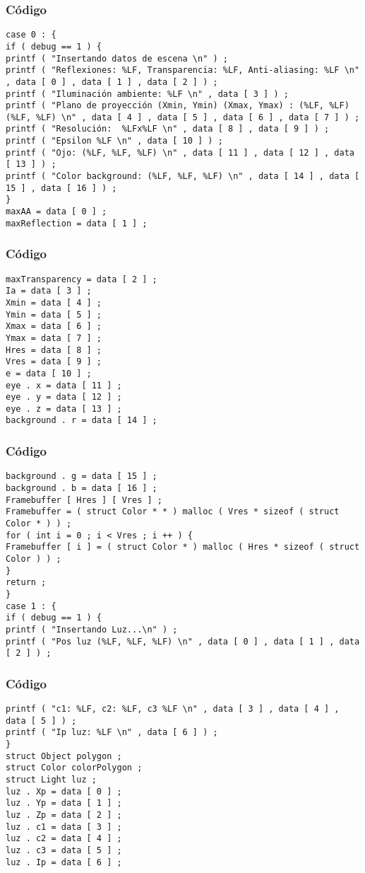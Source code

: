\documentclass{beamer}
\begin{document}
\begin{frame}[fragile]
\frametitle{C\'odigo}
\begin{verbatim}
case 0 : { 
if ( debug == 1 ) { 
printf ( "Insertando datos de escena \n" ) ; 
printf ( "Reflexiones: %LF, Transparencia: %LF, Anti-aliasing: %LF \n" , data [ 0 ] , data [ 1 ] , data [ 2 ] ) ; 
printf ( "Iluminación ambiente: %LF \n" , data [ 3 ] ) ; 
printf ( "Plano de proyección (Xmin, Ymin) (Xmax, Ymax) : (%LF, %LF) (%LF, %LF) \n" , data [ 4 ] , data [ 5 ] , data [ 6 ] , data [ 7 ] ) ; 
printf ( "Resolución:  %LFx%LF \n" , data [ 8 ] , data [ 9 ] ) ; 
printf ( "Epsilon %LF \n" , data [ 10 ] ) ; 
printf ( "Ojo: (%LF, %LF, %LF) \n" , data [ 11 ] , data [ 12 ] , data [ 13 ] ) ; 
printf ( "Color background: (%LF, %LF, %LF) \n" , data [ 14 ] , data [ 15 ] , data [ 16 ] ) ; 
} 
maxAA = data [ 0 ] ; 
maxReflection = data [ 1 ] ; 
\end{verbatim}
\end{frame}
\begin{frame}[fragile]
\frametitle{C\'odigo}
\begin{verbatim}
maxTransparency = data [ 2 ] ; 
Ia = data [ 3 ] ; 
Xmin = data [ 4 ] ; 
Ymin = data [ 5 ] ; 
Xmax = data [ 6 ] ; 
Ymax = data [ 7 ] ; 
Hres = data [ 8 ] ; 
Vres = data [ 9 ] ; 
e = data [ 10 ] ; 
eye . x = data [ 11 ] ; 
eye . y = data [ 12 ] ; 
eye . z = data [ 13 ] ; 
background . r = data [ 14 ] ; 
\end{verbatim}
\end{frame}
\begin{frame}[fragile]
\frametitle{C\'odigo}
\begin{verbatim}
background . g = data [ 15 ] ; 
background . b = data [ 16 ] ; 
Framebuffer [ Hres ] [ Vres ] ; 
Framebuffer = ( struct Color * * ) malloc ( Vres * sizeof ( struct Color * ) ) ; 
for ( int i = 0 ; i < Vres ; i ++ ) { 
Framebuffer [ i ] = ( struct Color * ) malloc ( Hres * sizeof ( struct Color ) ) ; 
} 
return ; 
} 
case 1 : { 
if ( debug == 1 ) { 
printf ( "Insertando Luz...\n" ) ; 
printf ( "Pos luz (%LF, %LF, %LF) \n" , data [ 0 ] , data [ 1 ] , data [ 2 ] ) ; 
\end{verbatim}
\end{frame}
\begin{frame}[fragile]
\frametitle{C\'odigo}
\begin{verbatim}
printf ( "c1: %LF, c2: %LF, c3 %LF \n" , data [ 3 ] , data [ 4 ] , data [ 5 ] ) ; 
printf ( "Ip luz: %LF \n" , data [ 6 ] ) ; 
} 
struct Object polygon ; 
struct Color colorPolygon ; 
struct Light luz ; 
luz . Xp = data [ 0 ] ; 
luz . Yp = data [ 1 ] ; 
luz . Zp = data [ 2 ] ; 
luz . c1 = data [ 3 ] ; 
luz . c2 = data [ 4 ] ; 
luz . c3 = data [ 5 ] ; 
luz . Ip = data [ 6 ] ; 
\end{verbatim}
\end{frame}
\end{document}
